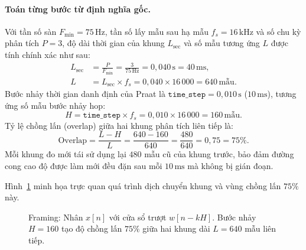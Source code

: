 \paragraph{Toán từng bước từ định nghĩa gốc.}
Với tần số sàn $F_{\min} = 75\,\text{Hz}$, tần số lấy mẫu sau hạ mẫu $f_s = 16\,\text{kHz}$ và số chu kỳ phân tích $P = 3$, độ dài thời gian của khung $L_{\mathrm{sec}}$ và số mẫu tương ứng $L$ được tính chính xác như sau:
\begin{align*}
L_{\mathrm{sec}} &= \frac{P}{F_{\min}} = \frac{3}{75\,\text{Hz}} = 0{,}040\,\text{s} = 40\,\text{ms},\\[6pt]
L &= L_{\mathrm{sec}} \times f_s = 0{,}040 \times 16\,000 = 640\,\text{mẫu}.
\end{align*}
Bước nhảy thời gian danh định của Praat là $\texttt{time\_step} = 0{,}010\,\text{s}$ ($10\,\text{ms}$), tương ứng số mẫu bước nhảy hop:
\[
H = \texttt{time\_step} \times f_s = 0{,}010 \times 16\,000 = 160\,\text{mẫu}.
\]
Tỷ lệ chồng lấn (overlap) giữa hai khung phân tích liên tiếp là:
\[
\text{Overlap} = \frac{L - H}{L} = \frac{640 - 160}{640} = \frac{480}{640} = 0{,}75 = 75\%.
\]
Mỗi khung đo mới tái sử dụng lại $480$ mẫu cũ của khung trước, bảo đảm đường cong cao độ được làm mới đều đặn sau mỗi $10\,\text{ms}$ mà không bị gián đoạn.

Hình~\ref{fig:ch01_framing} minh họa trực quan quá trình dịch chuyển khung và vùng chồng lấn $75\%$ này.

\begin{figure}[H]
\centering
{}
\caption{Framing: Nhân $x[n]$ với cửa sổ trượt $w[n-kH]$. Bước nhảy $H = 160$ tạo độ chồng lấn $75\%$ giữa hai khung dài $L = 640$ mẫu liên tiếp.}
\label{fig:ch01_framing}
\end{figure}

